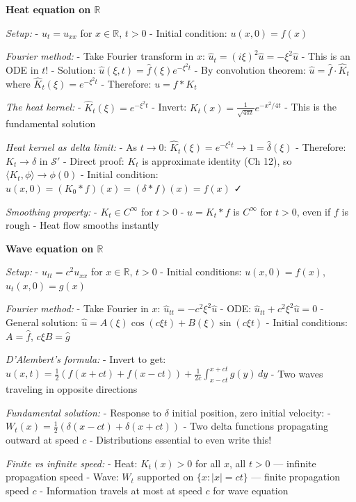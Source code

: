 \documentclass[
  10pt,
  letterpaper,
]{scrbook}
\begin{document}
\textbf{Heat equation on \(\mathbb{R}\)}

\emph{Setup:} - \(u_t = u_{xx}\) for \(x \in \mathbb{R}\), \(t > 0\) -
Initial condition: \(u(x, 0) = f(x)\)

\emph{Fourier method:} - Take Fourier transform in \(x\):
\(\hat{u}_t = (i\xi)^2 \hat{u} = -\xi^2 \hat{u}\) - This is an ODE in
\(t\)! - Solution: \(\hat{u}(\xi, t) = \hat{f}(\xi) e^{-\xi^2 t}\) - By
convolution theorem: \(\hat{u} = \hat{f} \cdot \hat{K}_t\) where
\(\hat{K}_t(\xi) = e^{-\xi^2 t}\) - Therefore: \(u = f * K_t\)

\emph{The heat kernel:} - \(\hat{K}_t(\xi) = e^{-\xi^2 t}\) - Invert:
\(K_t(x) = \frac{1}{\sqrt{4\pi t}} e^{-x^2/4t}\) - This is the
fundamental solution

\emph{Heat kernel as delta limit:} - As \(t \to 0\):
\(\hat{K}_t(\xi) = e^{-\xi^2 t} \to 1 = \hat{\delta}(\xi)\) - Therefore:
\(K_t \to \delta\) in \(\mathcal{S}'\) - Direct proof: \(K_t\) is
approximate identity (Ch 12), so
\(\langle K_t, \phi \rangle \to \phi(0)\) - Initial condition:
\(u(x,0) = (K_0 * f)(x) = (\delta * f)(x) = f(x)\) ✓

\emph{Smoothing property:} - \(K_t \in C^\infty\) for \(t > 0\) -
\(u = K_t * f\) is \(C^\infty\) for \(t > 0\), even if \(f\) is rough -
Heat flow smooths instantly

\textbf{Wave equation on \(\mathbb{R}\)}

\emph{Setup:} - \(u_{tt} = c^2 u_{xx}\) for \(x \in \mathbb{R}\),
\(t > 0\) - Initial conditions: \(u(x,0) = f(x)\), \(u_t(x,0) = g(x)\)

\emph{Fourier method:} - Take Fourier in \(x\):
\(\hat{u}_{tt} = -c^2\xi^2 \hat{u}\) - ODE:
\(\hat{u}_{tt} + c^2\xi^2 \hat{u} = 0\) - General solution:
\(\hat{u} = A(\xi)\cos(c\xi t) + B(\xi)\sin(c\xi t)\) - Initial
conditions: \(A = \hat{f}\), \(c\xi B = \hat{g}\)

\emph{D'Alembert's formula:} - Invert to get:
\(u(x,t) = \frac{1}{2}(f(x+ct) + f(x-ct)) + \frac{1}{2c}\int_{x-ct}^{x+ct} g(y)\, dy\)
- Two waves traveling in opposite directions

\emph{Fundamental solution:} - Response to \(\delta\) initial position,
zero initial velocity: -
\(W_t(x) = \frac{1}{2}(\delta(x-ct) + \delta(x+ct))\) - Two delta
functions propagating outward at speed \(c\) - Distributions essential
to even write this!

\emph{Finite vs infinite speed:} - Heat: \(K_t(x) > 0\) for all \(x\),
all \(t > 0\) --- infinite propagation speed - Wave: \(W_t\) supported
on \(\{x : |x| = ct\}\) --- finite propagation speed \(c\) - Information
travels at most at speed \(c\) for wave equation
\end{document}

